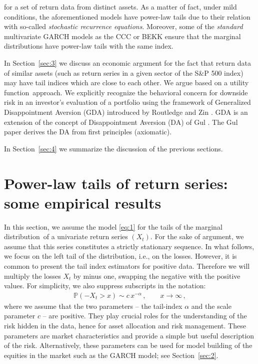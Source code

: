 \documentclass[11pt,a4]{amsart}
\newcommand{\sre}{stochastic recurrence equation}
\newcommand{\beam}{\begin{eqnarray}}
\newcommand{\eeam}{\end{eqnarray}\noindent}
\newcommand{\xto}{x\to\infty}
\newcommand{\fct}{function}
\newcommand{\ds}{distribution}
\newcommand{\seq}{sequence}
\renewcommand{\P }{{\mathbb P}}
\newcommand{\1}{{\mathbf 1}}
\begin{document}
for a set of return data from distinct assets. As a matter of fact, under mild conditions, the aforementioned models
have power-law tails due to their relation with so-called {\em \sre s}. Moreover, some of the {\em standard} multivariate 
GARCH models as the CCC or BEKK ensure that the marginal \ds s have power-law tails with the same index.
\par
In Section~\ref{sec:3} we discuss an economic argument for the fact that return data of similar assets
(such as return series in a given sector of the S\&P 500 index) may have tail indices which are close to each other.
We argue based on a  utility \fct\ approach. We explicitly recognize the behavioral
concern for downside risk in an investor's evaluation of a portfolio
using the framework of Generalized Disappointment Aversion (GDA)
introduced by Routledge and Zin \cite{routledge2010generalized}. GDA
is an extension of the concept of Disappointment Aversion (DA) of Gul \cite{gul:1991}. The Gul paper derives the DA from first principles (axiomatic).
\par 
In Section~\ref{sec:4} we summarize the discussion of the previous
sections. 




\section{Power-law tails of return series: some empirical results}\label{sec:1}\setcounter{equation}{0}
In this section, we assume the model \eqref{eq:1} for the tails of the marginal
\ds\ of a univariate return series $(X_t)$. For the sake of argument, we assume
that this series constitutes a strictly stationary \seq . In what follows, we focus
on the left tail of the \ds , i.e., on the losses. 
However, it is common to present the tail index estimators
for positive data. Therefore we will multiply the losses $X_t$ by
minus one, swapping the negative with the positive values.
For simplicity, we also suppress subscripts in the notation:
\beam\label{eq:1a}
\P(-X_t>x)\sim c\,x^{-\alpha}\,,\qquad \xto\,,
\eeam
where we assume that the two parameters -- the tail-index  $\alpha$ and the scale parameter
$c$ -- are positive. They play crucial roles for the understanding of the risk hidden in the data, hence 
for asset allocation and risk management. These parameters are market characteristics  and provide a simple but 
useful description of the risk. Alternatively, these parameters can be
used for model building of the equities in the market such as the GARCH model; see Section~\ref{sec:2}.
\end{document}
